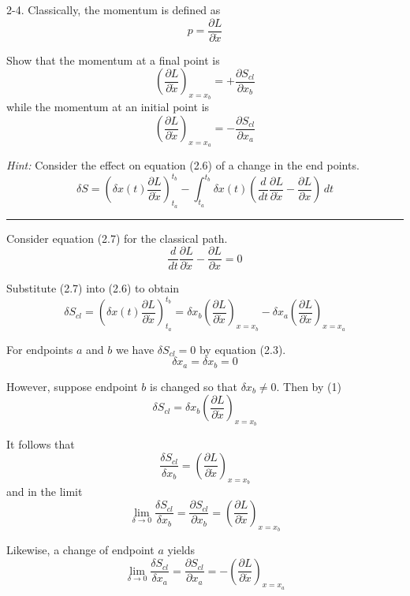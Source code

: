\documentclass[12pt]{article}
\begin{document}
2-4.
Classically, the momentum is defined as
\begin{equation*}
p=\frac{\partial L}{\partial\dot x}
\tag{2.10}
\end{equation*}

Show that the momentum at a final point is
\begin{equation*}
\left(\frac{\partial L}{\partial\dot x}\right)_{x=x_b}
=+\frac{\partial S_{cl}}{\partial x_b}
\tag{2.11}
\end{equation*}
while the momentum at an initial point is
\begin{equation*}
\left(\frac{\partial L}{\partial\dot x}\right)_{x=x_a}
=-\frac{\partial S_{cl}}{\partial x_a}
\end{equation*}

{\it Hint:} Consider the effect on equation (2.6)
of a change in the end points.
\begin{equation*}
\delta S=\left(\delta x(t)\frac{\partial L}{\partial\dot x}\right)_{t_a}^{t_b}
-\int_{t_a}^{t_b}\delta x(t)
\left(\frac{d}{dt}\frac{\partial L}{\partial\dot x}
-\frac{\partial L}{\partial x}\right)\,dt
\tag{2.6}
\end{equation*}

\bigskip
\hrule

\bigskip
Consider equation (2.7) for the classical path.
\begin{equation*}
\frac{d}{dt}\frac{\partial L}{\partial\dot x}
-\frac{\partial L}{\partial x}=0
\tag{2.7}
\end{equation*}

Substitute (2.7) into (2.6) to obtain
\begin{equation*}
\delta S_{cl}=\left(\delta x(t)\frac{\partial L}{\partial\dot x}\right)_{t_a}^{t_b}
=\delta x_b\left(\frac{\partial L}{\partial\dot x}\right)_{x=x_b}
-\delta x_a\left(\frac{\partial L}{\partial\dot x}\right)_{x=x_a}
\tag{1}
\end{equation*}

For endpoints $a$ and $b$ we have $\delta S_{cl}=0$ by equation (2.3).
\begin{equation*}
\delta x_a=\delta x_b=0
\tag{2.3}
\end{equation*}

However, suppose endpoint $b$ is changed so that $\delta x_b\ne0$.
Then by (1)
\begin{equation*}
\delta S_{cl}=\delta x_b\left(\frac{\partial L}{\partial\dot x}\right)_{x=x_b}
\end{equation*}

It follows that
\begin{equation*}
\frac{\delta S_{cl}}{\delta x_b}
=\left(\frac{\partial L}{\partial\dot x}\right)_{x=x_b}
\end{equation*}
and in the limit
\begin{equation*}
\lim_{\delta\rightarrow0}\frac{\delta S_{cl}}{\delta x_b}=\frac{\partial S_{cl}}{\partial x_b}
=\left(\frac{\partial L}{\partial\dot x}\right)_{x=x_b}
\end{equation*}

Likewise, a change of endpoint $a$ yields
\begin{equation*}
\lim_{\delta\rightarrow0}\frac{\delta S_{cl}}{\delta x_a}=\frac{\partial S_{cl}}{\partial x_a}
=-\left(\frac{\partial L}{\partial\dot x}\right)_{x=x_a}
\end{equation*}
\end{document}
